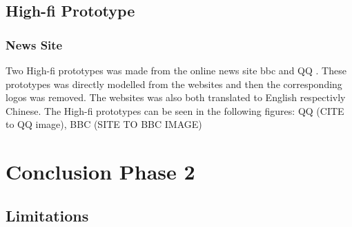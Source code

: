 \subsection{High-fi Prototype}
\subsubsection{News Site}
Two High-fi prototypes was made from the online news site bbc \cite{bbc} and QQ \cite{qq_homepage}. These prototypes was directly modelled from the websites and then the corresponding logos was removed. The websites was also both translated to English respectivly Chinese. The High-fi prototypes can be seen in the following figures: QQ (CITE to QQ image), BBC (SITE TO BBC IMAGE)





\section{Conclusion Phase 2}

\subsection{Limitations}